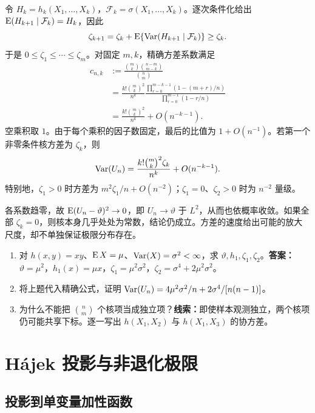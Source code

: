 令 $H_k=h_k(X_1,\ldots,X_k)$，$\mathcal F_k=\sigma(X_1,\ldots,X_k)$。逐次条件化给出 $\operatorname{E}(H_{k+1}\mid\mathcal F_k)=H_k$，因此
\[
 \zeta_{k+1}=\zeta_k+
 \operatorname{E}\{\operatorname{Var}(H_{k+1}\mid\mathcal F_k)\}\geq\zeta_k.
\]
于是 $0\leq\zeta_1\leq\cdots\leq\zeta_m$。对固定 $m,k$，精确方差系数满足
\begin{align*}
 c_{n,k}
 &:=\frac{\binom mk\binom{n-m}{m-k}}{\binom nm}\\
 &=\frac{k!\binom mk^2}{n^k}
 \frac{\prod_{r=0}^{m-k-1}(1-(m+r)/n)}
      {\prod_{r=0}^{m-1}(1-r/n)}\\
 &=\frac{k!\binom mk^2}{n^k}+O(n^{-k-1}).
\end{align*}
空乘积取 $1$。由于每个乘积的因子数固定，最后的比值为 $1+O(n^{-1})$。若第一个非零条件核方差为 $\zeta_k$，则
\begin{equation}
 \operatorname{Var}(U_n)=\frac{k!\binom mk^2\zeta_k}{n^k}
            +O(n^{-k-1}).
 \label{eq:ch4-var-rate}
\end{equation}
特别地，$\zeta_1>0$ 时方差为 $m^2\zeta_1/n+O(n^{-2})$；$\zeta_1=0$、$\zeta_2>0$ 时为 $n^{-2}$ 量级。

各系数趋零，故 $\operatorname{E}(U_n-\vartheta)^2\to0$，即 $U_n\to\vartheta$ 于 $L^2$，从而也依概率收敛。如果全部 $\zeta_k=0$，则核本身几乎处处为常数，结论仍成立。方差的速度给出可能的放大尺度，却不单独保证极限分布存在。

\begin{notebox}[练习与答案线索]
\begin{enumerate}
 \item 对 $h(x,y)=xy$、$\operatorname{E} X=\mu$、$\operatorname{Var}(X)=\sigma^2<\infty$，求 $\vartheta,h_1,\zeta_1,\zeta_2$。\textbf{答案：}$\vartheta=\mu^2$，$h_1(x)=\mu x$，$\zeta_1=\mu^2\sigma^2$，$\zeta_2=\sigma^4+2\mu^2\sigma^2$。
 \item 将上题代入精确公式，证明 $\operatorname{Var}(U_n)=4\mu^2\sigma^2/n+2\sigma^4/[n(n-1)]$。
 \item 为什么不能把 $\binom nm$ 个核项当成独立项？\textbf{线索：}即使样本观测独立，两个核项仍可能共享下标。逐一写出 $h(X_1,X_2)$ 与 $h(X_1,X_3)$ 的协方差。
\end{enumerate}
\end{notebox}

\section{H\'ajek 投影与非退化极限}

\subsection{投影到单变量加性函数}

